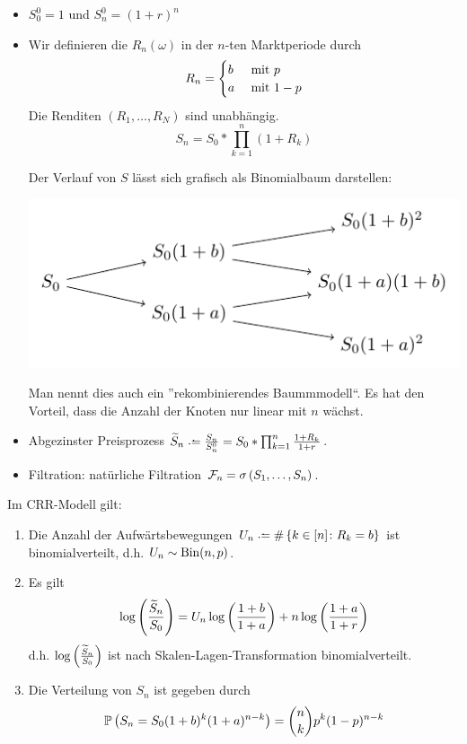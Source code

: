 \begin{itemize}
	\item $S_0^0 = 1$ und $S_n^0 = (1+r)^n$
	\item Wir definieren die  $R_n(\omega)$ in der $n$-ten Marktperiode durch
	\begin{equation*}
		R_n = \begin{cases} b & \mit p \\ a & \mit 1-p \end{cases}
	\end{equation*}
	Die Renditen $(R_1, \dots, R_N)$ sind unabhängig.
	\begin{equation*}
		S_n = S_0 * \prod_{k=1}^n (1+R_k)
	\end{equation*}
	
	Der Verlauf von $S$ lässt sich grafisch als Binomialbaum darstellen:
	
	\begin{center}
		\includegraphics[width=.5\textwidth]{img/crr-baum.pdf}
	\end{center}
	
	Man nennt dies auch ein ''rekombinierendes Baummmodell``. Es hat den Vorteil, dass die Anzahl der Knoten nur linear mit $n$ wächst.
	
	\item Abgezinster Preisprozess $\schlange{S}_n \defeq \frac{S_n}{S_n^0} = S_0 * \prod_{k=1}^n \frac{1+R_k}{1+r}$.
	
	\item Filtration: natürliche Filtration $\F_n = \sigma \brackets{S_1, \dots, S_n}$.
\end{itemize}

\begin{proposition} %
	Im CRR-Modell gilt:
	\begin{enumerate}[label=(\alph*)]
		\item Die Anzahl der Aufwärtsbewegungen $U_n \defeq \# \menge{k \in [n] \colon R_k = b}$ ist binomialverteilt, d.h. $U_n \sim \Bin(n,p)$.
		\item Es gilt 
		\begin{equation*}
			\log\brackets{\frac{\schlange{S}_n}{S_0}} = U_n \log\brackets{\frac{1+b}{1+a}} + n \log\brackets{\frac{1+a}{1+r}}
		\end{equation*}
		d.h. $\log\brackets{\frac{\schlange{S}_n}{S_0}}$ ist nach Skalen-Lagen-Transformation binomialverteilt.
		\item Die Verteilung von $S_n$ ist gegeben durch
		\begin{equation*}
			\P\brackets{S_n = S_0 (1+b)^k (1+a)^{n-k}} = \binom{n}{k} p^k (1-p)^{n-k}
		\end{equation*} 
	\end{enumerate}
\end{proposition}

